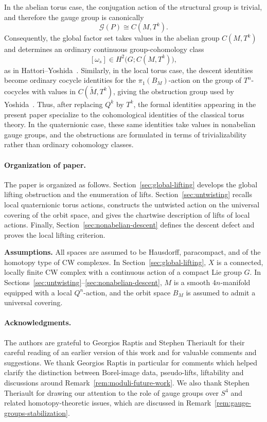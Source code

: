 \documentclass[11pt,a4paper]{article}
\numberwithin{equation}{section}
\theoremstyle{named}
\begin{document}
In the abelian torus case, the conjugation action of the structural group is trivial, and therefore the gauge group is canonically \[ \mathcal G(P)\cong C(M,T^k). \] Consequently, the global factor set takes values in the abelian group \(C(M,T^k)\) and determines an ordinary continuous group-cohomology class \[ [\omega_s]\in H^2\bigl(G;C(M,T^k)\bigr), \] as in Hattori--Yoshida~\cite{hatyos}. Similarly, in the local torus case, the descent identities become ordinary cocycle identities for the \(\pi_1(B_M)\)-action on the group of \(T^n\)-cocycles with values in \(C(\widetilde M,T^k)\), giving the obstruction group used by Yoshida~\cite{Yoshida1}. Thus, after replacing \(Q^k\) by \(T^k\), the formal identities appearing in the present paper specialize to the cohomological identities of the classical torus theory. In the quaternionic case, these same identities take values in nonabelian gauge groups, and the obstructions are formulated in terms of trivializability rather than ordinary cohomology classes.

\paragraph*{Organization of paper.}The paper is organized as follows. Section~\ref{sec:global-lifting} develops the global lifting obstruction and the enumeration of lifts. Section~\ref{sec:untwisting} recalls local quaternionic torus actions, constructs the untwisted action on the universal covering of the orbit space, and gives the chartwise description of lifts of local actions. Finally, Section~\ref{sec:nonabelian-descent} defines the descent defect and proves the local lifting criterion.

\textbf{Assumptions.}
All spaces are assumed to be Hausdorff, paracompact, and of the homotopy type of CW complexes. In Section~\ref{sec:global-lifting}, \(X\) is a connected, locally finite CW complex with a continuous action of a compact Lie group \(G\). In Sections~\ref{sec:untwisting}--\ref{sec:nonabelian-descent}, \(M\) is a smooth \(4n\)-manifold equipped with a local \(Q^n\)-action, and the orbit space \(B_M\) is assumed to admit a universal covering.

\paragraph*{Acknowledgments.}
The authors are grateful to Georgios Raptis and Stephen Theriault for their careful reading of an earlier version of this work and for valuable comments and suggestions. We thank Georgios Raptis in particular for comments which helped clarify the distinction between Borel-image data, pseudo-lifts, liftability and discussions around Remark~\ref{rem:moduli-future-work}. We also thank Stephen Theriault for drawing our attention to the role of gauge groups over \(S^4\) and related homotopy-theoretic issues, which are discussed in Remark~\ref{rem:gauge-groups-stabilization}.
\end{document}
